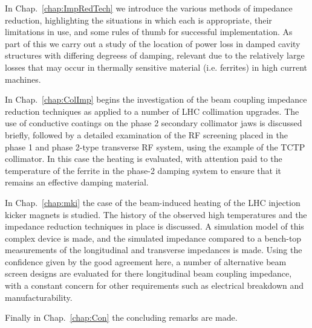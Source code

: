 In Chap.~\ref{chap:ImpRedTech} we introduce the various methods of impedance reduction, highlighting the situations in which each is appropriate, their limitations in use, and some rules of thumb for successful implementation. As part of this we carry out a study of the location of power loss in damped cavity structures with differing degreess of damping, relevant due to the relatively large losses that may occur in thermally sensitive material (i.e. ferrites) in high current machines.

In Chap.~\ref{chap:ColImp} begins the investigation of the beam coupling impedance reduction techniques as applied to a number of LHC collimation upgrades. The use of conductive coatings on the phase 2 secondary collimator jaws is discussed briefly, followed by a detailed examination of the RF screening placed in the phase 1 and phase 2-type transverse RF system, using the example of the TCTP collimator. In this case the heating is evaluated, with attention paid to the temperature of the ferrite in the phase-2 damping system to ensure that it remains an effective damping material.

In Chap.~\ref{chap:mki} the case of the beam-induced heating of the LHC injection kicker magnets is studied. The history of the observed high temperatures and the impedance reduction techniques in place is discussed. A simulation model of this complex device is made, and the simulated impedance compared to a bench-top measurements of the longitudinal and transverse impedances is made. Using the confidence given by the good agreement here, a number of alternative beam screen designs are evaluated for there longitudinal beam coupling impedance, with a constant concern for other requirements such as electrical breakdown and manufacturability.

Finally in Chap.~\ref{chap:Con} the concluding remarks are made.